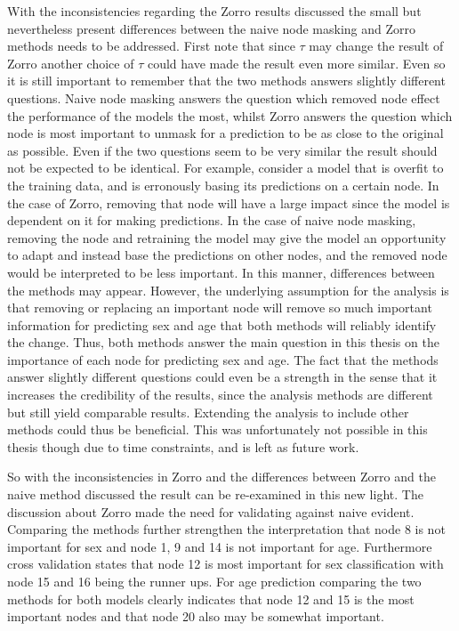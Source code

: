 With the inconsistencies regarding the Zorro results discussed the small but nevertheless present differences between the naive node masking and Zorro methods needs to be addressed. First note that since $\tau$ may change the result of Zorro another choice of $\tau$ could have made the result even more similar. Even so it is still important to remember that the two methods answers slightly different questions. Naive node masking answers the question which removed node effect the performance of the models the most, whilst Zorro answers the question which node is most important to unmask for a prediction to be as close to the original as possible. Even if the two questions seem to be very similar the result should not be expected to be identical. For example, consider a model that is overfit to the training data, and is erronously basing its predictions on a certain node. In the case of Zorro, removing that node will have a large impact since the model is dependent on it for making predictions. In the case of naive node masking, removing the node and retraining the model may give the model an opportunity to adapt and instead base the predictions on other nodes, and the removed node would be interpreted to be less important. In this manner, differences between the methods may appear. However, the underlying assumption for the analysis is that removing or replacing an important node will remove so much important information for predicting sex and age that both methods will reliably identify the change. Thus, both methods answer the main question in this thesis on the importance of each node for predicting sex and age. The fact that the methods answer slightly different questions could even be a strength in the sense that it increases the credibility of the results, since the analysis methods are different but still yield comparable results. Extending the analysis to include other methods could thus be beneficial. This was unfortunately not possible in this thesis though due to time constraints, and is left as future work.

So with the inconsistencies in Zorro and the differences between Zorro and the naive method discussed the result can be re-examined in this new light. The discussion about Zorro made the need for validating against naive evident. Comparing the methods further strengthen the interpretation that node 8 is not important for sex and node 1, 9 and 14 is not important for age. Furthermore cross validation states that node 12 is most important for sex classification with node 15 and 16 being the runner ups. For age prediction comparing the two methods for both models clearly indicates that node 12 and 15 is the most important nodes and that node 20 also may be somewhat important. 



